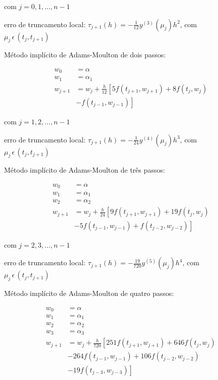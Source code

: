\documentclass[final,5p]{elsarticle}
\numberwithin{equation}{section}
\begin{document}
        \noindent com $j=0,1,\ldots,n-1$

        \noindent erro de truncamento local: $\tau_{j+1}(h) = -\frac{1}{12}y^{(3)}(\mu_j)h^2$, com \\ $\mu_j \, \epsilon \, (t_j,t_{j+1})$

        Método implícito de Adams-Moulton de dois passos:

        \begin{align}
            w_0 &= \alpha \nonumber \\
            w_1 &= \alpha_1 \nonumber \\
            w_{j+1} &= w_j + \frac{h}{12} \left[ 5 f(t_{j+1}, w_{j+1}) + 8 f(t_j, w_j) \right. \nonumber \\
            &\left. - f(t_{j-1}, w_{j-1}) \right] \label{eq:adamsmoulton2}
        \end{align}

        \noindent com $j=1,2,\ldots,n-1$

        \noindent erro de truncamento local: $\tau_{j+1}(h) = -\frac{1}{24}y^{(4)}(\mu_j)h^3$, com \\ $\mu_j \, \epsilon \, (t_j,t_{j+1})$

        Método implícito de Adams-Moulton de três passos:

        \begin{align}
            w_0 &= \alpha \nonumber \\
            w_1 &= \alpha_1 \nonumber \\
            w_2 &= \alpha_2 \nonumber \\
            w_{j+1} &= w_j + \frac{h}{24} \left[ 9 f(t_{j+1}, w_{j+1}) + 19 f(t_j, w_j) \right. \nonumber \\
            &\left. - 5 f(t_{j-1}, w_{j-1}) +f(t_{j-2}, w_{j-2}) \right] \label{eq:adamsmoulton3}
        \end{align}

        \noindent com $j=2,3,\ldots,n-1$

        \noindent erro de truncamento local: $\tau_{j+1}(h) = -\frac{19}{720}y^{(5)}(\mu_j)h^4$, com \\ $\mu_j \, \epsilon \, (t_j,t_{j+1})$

        Método implícito de Adams-Moulton de quatro passos:

        \begin{align}
            w_0 &= \alpha \nonumber \\
            w_1 &= \alpha_1 \nonumber \\
            w_2 &= \alpha_2 \nonumber \\
            w_3 &= \alpha_3 \nonumber \\
            w_{j+1} &= w_j + \frac{h}{720} \left[ 251 f(t_{j+1}, w_{j+1}) + 646 f(t_j, w_j) \right. \nonumber \\
            & - 264 f(t_{j-1}, w_{j-1}) + 106 f(t_{j-2}, w_{j-2}) \nonumber \\
            &\left. - 19 f(t_{j-3}, w_{j-3}) \right] \label{eq:adamsmoulton4}
        \end{align}
\end{document}
